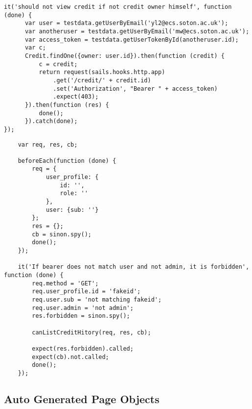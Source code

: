 \begin{listing}[H]
\begin{verbatim}
it('should not view credit if not credit owner himself', function (done) {
      var user = testdata.getUserByEmail('yl2@ecs.soton.ac.uk');
      var anotheruser = testdata.getUserByEmail('mw@ecs.soton.ac.uk');
      var access_token = testdata.getUserTokenById(anotheruser.id);
      var c;
      Credit.findOne({owner: user.id}).then(function (credit) {
          c = credit;
          return request(sails.hooks.http.app)
              .get('/credit/' + credit.id)
              .set('Authorization', "Bearer " + access_token)
              .expect(403);
      }).then(function (res) {
          done();
      }).catch(done);
});
\end{verbatim}
\label{lst:creditcontroller-test-file}
\end{listing}

\begin{listing}[H]
\begin{verbatim}
    var req, res, cb;

    beforeEach(function (done) {
        req = {
            user_profile: {
                id: '',
                role: ''
            },
            user: {sub: ''}
        };
        res = {};
        cb = sinon.spy();
        done();
    });

    it('If bearer does not match user and not admin, it is forbidden', function (done) {
        req.method = 'GET';
        req.user_profile.id = 'fakeid';
        req.user.sub = 'not matching fakeid';
        req.user.admin = 'not admin';
        res.forbidden = sinon.spy();

        canListCreditHitory(req, res, cb);

        expect(res.forbidden).called;
        expect(cb).not.called;
        done();
    });
\end{verbatim}
\label{lst:can-list-credit-test}
\end{listing}

\subsection{Auto Generated Page Objects}
\label{subsec:auto-generated-page-objects}

